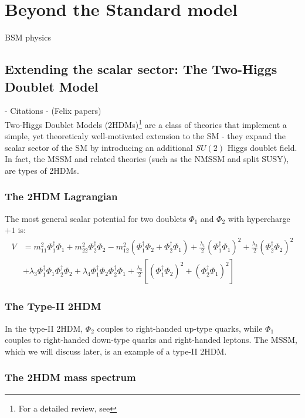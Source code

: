 \chapter{Beyond the Standard model}\label{ch:bsm}

BSM physics

\section{Extending the scalar sector: The Two-Higgs Doublet Model}

- Citations - (Felix papers)\\

Two-Higgs Doublet Models (2HDMs)\footnote{For a detailed review, see\citep{Branco2012}} are a class of theories that implement a simple, yet theoreticaly well-motivated extension to the SM - they expand the scalar sector of the SM by introducing an additional $SU(2)$ Higgs doublet field. In fact, the MSSM and related theories (such as the NMSSM and split SUSY), are types of 2HDMs.

\subsection{The 2HDM Lagrangian}
The most general scalar potential for two doublets $\Phi_1$ and $\Phi_2$ with hypercharge $+1$ is:
\begin{align*}
  V &= m_{11}^2\Phi_1^\dagger\Phi_1 + m_{22}^2\Phi_2^\dagger\Phi_2 - m_{12}^2\left(\Phi_1^\dagger\Phi_2 + \Phi_2^\dagger\Phi_1 \right) + \frac{\lambda_1}{2}\left(\Phi_1^\dagger\Phi_1 \right)^2 + \frac{\lambda_2}{2}\left(\Phi_2^\dagger\Phi_2 \right)^2\\
&  +\lambda_3\Phi_1^\dagger\Phi_1 \Phi_2^\dagger\Phi_2 + \lambda_4\Phi_1^\dagger\Phi_2 \Phi_2^\dagger\Phi_1 + \frac{\lambda_5}{2}\left[\left(\Phi_1^\dagger\Phi_2 \right)^2+\left(\Phi_2^\dagger\Phi_1\right)^2 \right]
\end{align*}

\subsection{The Type-II 2HDM}

In the type-II 2HDM, $\Phi_2$ couples to right-handed up-type quarks, while $\Phi_1$ couples to right-handed down-type quarks and right-handed leptons. The MSSM, which we will discuss later, is an example of a type-II 2HDM.

\subsection{The 2HDM mass spectrum}

